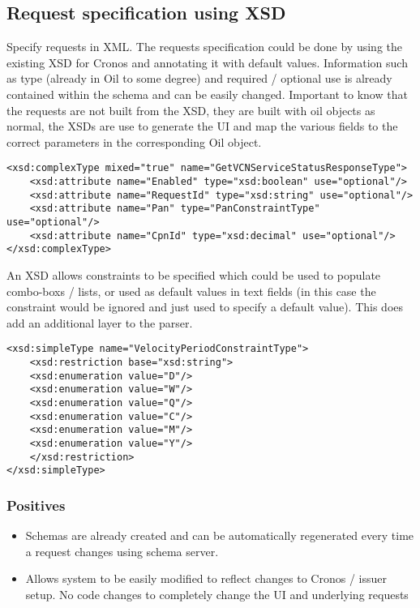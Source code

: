\documentclass[a4paper,12pt, titlepage]{article}
\begin{document}
	\subsection{Request specification using XSD}
	Specify requests in XML. The requests specification could be done by using the existing XSD for Cronos and annotating it with default values. Information such as type (already in Oil to some degree) and required / optional use is already contained within the schema and can be easily changed. Important to know that the requests are not built from the XSD, they are built with oil objects as normal, the XSDs are use to generate the UI and map the various fields to the correct parameters in the corresponding Oil object.
	\begin{verbatim}
<xsd:complexType mixed="true" name="GetVCNServiceStatusResponseType">
    <xsd:attribute name="Enabled" type="xsd:boolean" use="optional"/>
    <xsd:attribute name="RequestId" type="xsd:string" use="optional"/>
    <xsd:attribute name="Pan" type="PanConstraintType" use="optional"/>
    <xsd:attribute name="CpnId" type="xsd:decimal" use="optional"/>
</xsd:complexType>
	\end{verbatim}
	An XSD allows constraints to be specified which could be used to populate combo-boxs / lists, or used as default values in text fields (in this case the constraint would be ignored and just used to specify a default value). This does add an additional layer to the parser.
	\begin{verbatim}
<xsd:simpleType name="VelocityPeriodConstraintType">
    <xsd:restriction base="xsd:string">
    <xsd:enumeration value="D"/>
    <xsd:enumeration value="W"/>
    <xsd:enumeration value="Q"/>
    <xsd:enumeration value="C"/>
    <xsd:enumeration value="M"/>
    <xsd:enumeration value="Y"/>
    </xsd:restriction>
</xsd:simpleType>
	\end{verbatim}
		\subsubsection{Positives}
		\begin{itemize}
		\item Schemas are already created and can be automatically regenerated every time a request changes using schema server.
		\item Allows system to be easily modified to reflect changes to Cronos / issuer setup. No code changes to completely change the UI and underlying requests
		\end{itemize}
\end{document}
